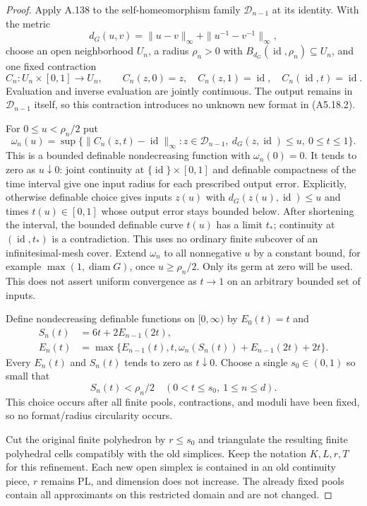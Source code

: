 \begin{proof}
Apply A.138 to the self-homeomorphism family $\mathcal D_{n-1}$ at its
identity. With the metric
\[
 d_G(u,v)=\|u-v\|_\infty+\|u^{-1}-v^{-1}\|_\infty,
\]
choose an open neighborhood $U_n$, a radius $\rho_n>0$ with
$B_{d_G}(\operatorname{id},\rho_n)\subseteq U_n$, and one fixed contraction
\[
 C_n:U_n\times[0,1]\to U_n,\qquad
 C_n(z,0)=z,\quad C_n(z,1)=\operatorname{id},\quad
 C_n(\operatorname{id},t)=\operatorname{id}.
 \tag{A5.18.3}
\]
Evaluation and inverse evaluation are jointly continuous. The output
remains in $\mathcal D_{n-1}$ itself, so this contraction introduces no
unknown new format in (A5.18.2).

For $0\le u<\rho_n/2$ put
\[
 \omega_n(u)=\sup\{\|C_n(z,t)-\operatorname{id}\|_\infty:
 z\in\mathcal D_{n-1},\ d_G(z,\operatorname{id})\le u,\ 0\le t\le1\}.
 \tag{A5.18.4}
\]
This is a bounded definable nondecreasing function with $\omega_n(0)=0$.
It tends to zero as $u\downarrow0$: joint continuity at
$\{\operatorname{id}\}\times[0,1]$ and definable compactness of the time
interval give one input radius for each prescribed output error.
Explicitly, otherwise definable choice gives inputs $z(u)$ with
$d_G(z(u),\operatorname{id})\le u$ and times $t(u)\in[0,1]$ whose output
error stays bounded below. After shortening the interval, the bounded
definable curve $t(u)$ has a limit $t_*$; continuity at
$(\operatorname{id},t_*)$ is a contradiction. This uses no ordinary
finite subcover of an infinitesimal-mesh cover.
Extend $\omega_n$ to all nonnegative $u$ by a constant bound, for example
$\max(1,\operatorname{diam}G)$, once $u\ge\rho_n/2$. Only its germ at zero
will be used. This does not assert uniform convergence as $t\to1$ on an
arbitrary bounded set of inputs.

Define nondecreasing definable functions on $[0,\infty)$ by $E_0(t)=t$ and
\[
\begin{split}
 S_n(t)&=6t+2E_{n-1}(2t),\\
 E_n(t)&=\max\{E_{n-1}(t),t,
       \omega_n(S_n(t))+E_{n-1}(2t)+2t\}.
\end{split}
\tag{A5.18.5}
\]
Every $E_n(t)$ and $S_n(t)$ tends to zero as $t\downarrow0$. Choose a single
$s_0\in(0,1)$ so small that
\[
 S_n(t)<\rho_n/2\quad(0<t\le s_0,\ 1\le n\le d).
 \tag{A5.18.6}
\]
This choice occurs after all finite pools, contractions, and moduli have
been fixed, so no format/radius circularity occurs.

Cut the original finite polyhedron by $r\le s_0$ and triangulate the
resulting finite polyhedral cells compatibly with the old simplices. Keep
the notation $K,L,r,T$ for this refinement. Each new open simplex is
contained in an old continuity piece, $r$ remains PL, and dimension does
not increase. The already fixed pools contain all approximants on this
restricted domain and are not changed.


\end{proof}
